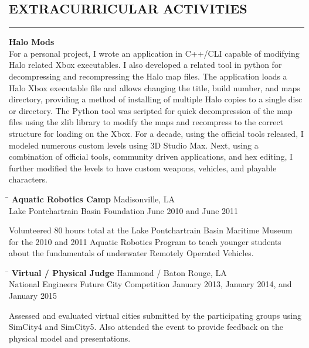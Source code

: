 \documentclass{res}
\begin{document}
\begin{resume}
\section{EXTRACURRICULAR ACTIVITIES}
	\vspace{0.005in}	
	\rule{\textwidth}{0.5pt}
	{\bf Halo Mods}\\
	For a personal project, I wrote an application in C++/CLI capable of modifying Halo related Xbox executables. I also developed a related tool in python for decompressing and recompressing the Halo map files. The application loads a Halo Xbox executable file and allows changing the title, build number, and maps directory, providing a method of installing of multiple Halo copies to a single disc or directory. The Python tool was scripted for quick decompression of the map files using the zlib library to modify the maps and recompress to the correct structure for loading on the Xbox. For a decade, using the official tools released, I modeled numerous custom levels using 3D Studio Max. Next, using a combination of official tools, community driven applications, and hex editing, I further modified the levels to have custom weapons, vehicles, and playable characters.
		
		
	\begin{tabbing}
		\hspace{4.475in}\= \kill %
		{\bf Aquatic Robotics Camp} \> \hspace{0.475in}Madisonville, LA \\
		Lake Pontchartrain Basin Foundation \> June 2010 and June 2011
	\end{tabbing}\vspace{-20pt}
	\vspace{8pt}Volunteered 80 hours total at the Lake Pontchartrain Basin Maritime Museum for the 2010 and 2011 Aquatic Robotics Program to teach younger students about the fundamentals of underwater Remotely Operated Vehicles.
	
	\begin{tabbing}
		\hspace{3.125in}\= \kill %
		{\bf Virtual / Physical Judge} \> \hspace{1in}Hammond / Baton Rouge, LA \\
		National Engineers Future City Competition \> January 2013, January 2014, and January 2015
	\end{tabbing}\vspace{-20pt}
	\vspace{8pt}Assessed and evaluated virtual cities submitted by the participating groups using SimCity4 and SimCity5. Also attended the event to provide feedback on the physical model and presentations.
	


\end{resume}
\end{document}
